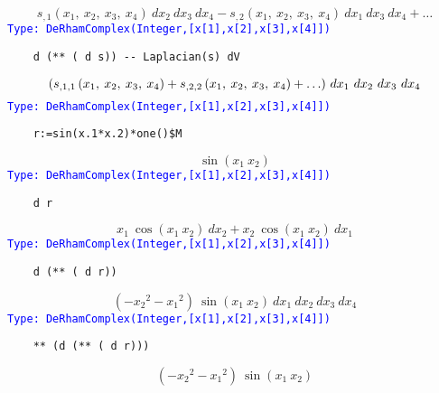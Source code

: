 \documentclass[12pt,a4paper]{article}
\newcommand{\type}[1]{\textcolor{blue}{\tt\tiny #1}}
\begin{document}
\begin{displaymath}
    {{{s _ {{,1}}} 
    \left({{x _ {1}}, \: {x _ {2}}, \: {x _ {3}}, \: {x _ {4}}} 
    \right)}\  {dx _ {2}} \  {dx _ {3}} \  {dx _ {4}}} -{{{s _ {{,2}}} 
    \left({{x _ {1}}, \: {x _ {2}}, \: {x _ {3}}, \: {x _ {4}}} 
    \right)}\  {dx _ {1}} \  {dx _ {3}} \  {dx _ {4}}}+ \ldots
\end{displaymath}
\type{Type: DeRhamComplex(Integer,[x[1],x[2],x[3],x[4]])}
\begin{lstlisting}
    d (** ( d s)) -- Laplacian(s) dV
\end{lstlisting}
\begin{displaymath}
    {\left( {{s \sb {{{,1}{,1}}}} \left(
    {{x \sb {1}}, \: {x \sb {2}}, \: {x \sb {3}}, \: {x \sb {4}}} 
    \right)}+{{s\sb {{{,2}{,2}}}} \left(
    {{x \sb {1}}, \: {x \sb {2}}, \: {x \sb {3}}, \: {x \sb {4}}} 
    \right)}+ \ldots\right)}
    \  {dx \sb {1}} \  {dx \sb {2}} \  {dx \sb {3}} \  {dx \sb {4}} 
\end{displaymath}
\type{Type: DeRhamComplex(Integer,[x[1],x[2],x[3],x[4]])}
\begin{lstlisting}
    r:=sin(x.1*x.2)*one()$M
\end{lstlisting}
\begin{displaymath}
    \sin \left({{{x _ {1}} \  {x _ {2}}}} \right)
\end{displaymath}
\type{Type: DeRhamComplex(Integer,[x[1],x[2],x[3],x[4]])}
\begin{lstlisting}
    d r
\end{lstlisting}
\begin{displaymath}
    {{x _ {1}} \  {\cos \left({{{x _ {1}} \  {x _ {2}}}} 
    \right)}\  {dx _ {2}}}+{{x _ {2}} \  {\cos \left(
    {{{x _ {1}} \  {x _ {2}}}} \right)}\  {dx _ {1}}} 
\end{displaymath}
\type{Type: DeRhamComplex(Integer,[x[1],x[2],x[3],x[4]])}
\begin{lstlisting}
    d (** ( d r))
\end{lstlisting}
\begin{displaymath}
    {\left( -{{{x _ {2}}} ^ {2}} -{{{x _ {1}}} ^ {2}} 
    \right)}\  {\sin \left({{{x _ {1}} \  {x _ {2}}}} 
    \right)}\  {dx _ {1}} \  {dx _ {2}} \  {dx _ {3}} \  {dx _ {4}} 
\end{displaymath}
\type{Type: DeRhamComplex(Integer,[x[1],x[2],x[3],x[4]])}
\begin{lstlisting}
    ** (d (** ( d r)))
\end{lstlisting}
\begin{displaymath}
    {\left( -{{{x _ {2}}} ^ {2}} -{{{x _ {1}}} ^ {2}} 
    \right)}\  {\sin  \left({{{x _ {1}} \  {x _ {2}}}} \right)} 
\end{displaymath}
\end{document}
